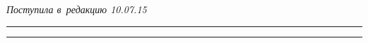 \vspace*{-6pt}





\hfill{\small\textit{Поступила в~редакцию 10.07.15}}














\vspace*{9pt}





\hrule





\vspace*{2pt}





\hrule
















\def\tit{THE EXPERIMENTAL ANALYSIS OF~THE~METHOD 


OF~CLUSTERING AND~RANKING OF~MULTIDIMENSIONAL DATA 


USING~THE~KOHONEN NEURAL NETWORK}





\def\titkol{The experimental analysis of~the~method 


of~clustering and~ranking of multidimensional} %










\def\aut{V.\,I.~Anikin$^1$, O.\,V.~Anikina$^2$, and A.\,A.~Karmanova$^3$}


\def\autkol{V.\,I.~Anikin, O.\,V.~Anikina, and A.\,A.~Karmanova}











